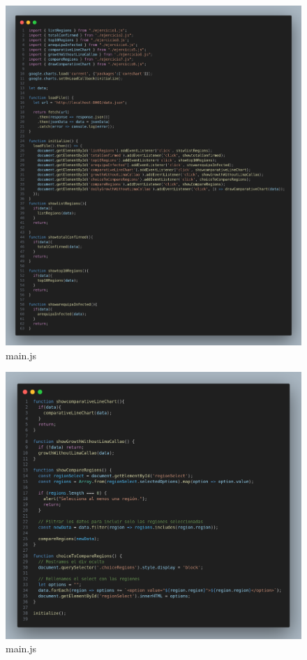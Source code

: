 \begin{figure}[H]
  \centering
  \includegraphics[width=1.0\textwidth]{img/main1_js.png}
  \caption{main.js}
\end{figure}
\begin{figure}[H]
  \centering
  \includegraphics[width=1.0\textwidth]{img/main2_js.png}
  \caption{main.js}
\end{figure}

